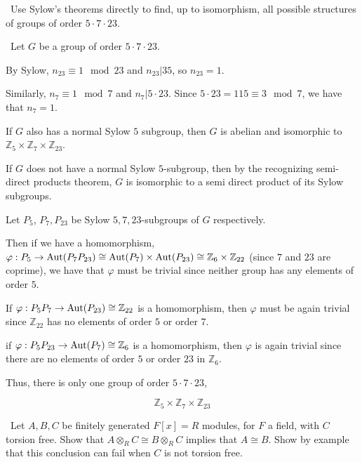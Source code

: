 \documentclass[12pt]{AlgebraQual}
\begin{document}
\begin{problem} $\,$
Use Sylow's theorems directly to find, up to isomorphism, all possible structures of groups of order $5\cdot7\cdot 23$.
\end{problem}


\begin{solution}$\,$
Let $G$ be a group of order $5\cdot 7\cdot 23.$

By Sylow, $n_{23}\equiv 1\mod 23$ and $n_{23}|35$, so $n_{23}=1$.

Similarly, $n_7\equiv 1\mod 7$ and $n_7|5\cdot23$. Since $5\cdot23=115\equiv 3\mod 7$, we have that $n_7=1$.

 If $G$ also has a normal Sylow $5$ subgroup, then $G$ is abelian and isomorphic to $\mathbb{Z}_5\times\mathbb{Z}_7\times\mathbb{Z}_{23}$.

If $G$ does not have a normal Sylow $5$-subgroup, then by the recognizing semi-direct products theorem, $G$ is isomorphic to a semi direct product of its Sylow subgroups.

 Let $P_5$, $P_7, P_{23}$ be Sylow $5,7,23$-subgroups of $G$ respectively.

Then if we have a homomorphism, $\varphi:P_5\to\text{Aut}(P_7P_{23})\cong\text{Aut}(P_7)\times\text{Aut}(P_{23})\cong\mathbb{Z}_6\times\mathbb{Z}_{22}$ (since $7$ and $23$ are coprime), we have that $\varphi$ must be trivial since neither group has any elements of order $5$.

 If $\varphi:P_5P_7\to\text{Aut}(P_{23})\cong\mathbb{Z}_{22}$ is a homomorphism, then $\varphi$ must be again trivial since $\mathbb{Z}_{22}$ has no elements of order $5$ or order $7.$

 if $\varphi:P_5P_{23}\to\text{Aut}(P_7)\cong\mathbb{Z}_6$ is a homomorphism, then $\varphi$ is again trivial since there are no elements of order $5$ or order $23$ in $\mathbb{Z}_6$.

Thus, there is only one group of order $5\cdot7\cdot23$, \begin{center}
    \begin{framed}
    $$\mathbb{Z}_5\times\mathbb{Z}_7\times\mathbb{Z}_{23}$$
    \end{framed}
\end{center}


\end{solution}
\newpage


\begin{problem} $\,$
Let $A,B,C$ be finitely generated $F[x]=R$ modules, for $F$ a field, with $C$ torsion free. Show that $A\otimes_RC\cong B\otimes_RC$ implies that $A\cong B$. Show by example that this conclusion can fail when $C$ is not torsion free.
\end{problem}
\end{document}
